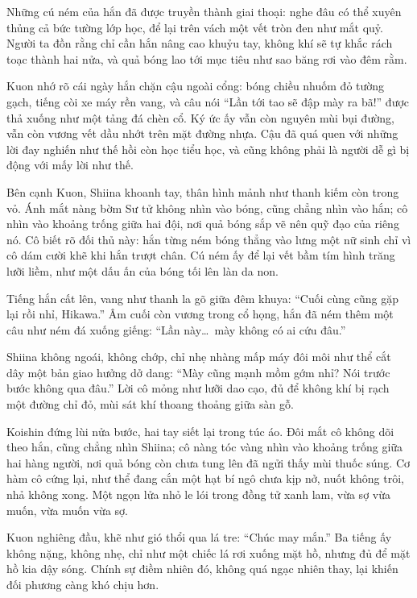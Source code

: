 \documentclass[../main.tex]{subfiles}
\begin{document}
Những cú ném của hắn đã được truyền thành giai thoại: nghe đâu có thể xuyên thủng cả bức tường lớp học, để lại trên vách một vết tròn đen như mắt quỷ. Người ta đồn rằng chỉ cần hắn nâng cao khuỷu tay, không khí sẽ tự khắc rách toạc thành hai nửa, và quả bóng lao tới mục tiêu như sao băng rơi vào đêm rằm.

Kuon nhớ rõ cái ngày hắn chặn cậu ngoài cổng: bóng chiều nhuốm đỏ tường gạch, tiếng còi xe máy rền vang, và câu nói ``Lần tới tao sẽ đập mày ra bã!'' được thả xuống như một tảng đá chèn cổ. Ký ức ấy vẫn còn nguyên mùi bụi đường, vẫn còn vương vết dầu nhớt trên mặt đường nhựa. Cậu đã quá quen với những lời đay nghiến như thế hồi còn học tiểu học, và cũng không phải là người dễ gì bị động với mấy lời như thế.

Bên cạnh Kuon, Shiina khoanh tay, thân hình mảnh như thanh kiếm còn trong vỏ. Ánh mắt nàng bờm Sư tử không nhìn vào bóng, cũng chẳng nhìn vào hắn; cô nhìn vào khoảng trống giữa hai đội, nơi quả bóng sắp vẽ nên quỹ đạo của riêng nó. Cô biết rõ đối thủ này: hắn từng ném bóng thẳng vào lưng một nữ sinh chỉ vì cô dám cười khẽ khi hắn trượt chân. Cú ném ấy để lại vết bầm tím hình trăng lưỡi liềm, như một dấu ấn của bóng tối lên làn da non.

Tiếng hắn cất lên, vang như thanh la gõ giữa đêm khuya: ``Cuối cùng cũng gặp lại rồi nhỉ, Hikawa.'' Âm cuối còn vương trong cổ họng, hắn đã ném thêm một câu như ném đá xuống giếng: ``Lần này\dots\ mày không có ai cứu đâu.''

Shiina không ngoái, không chớp, chỉ nhẹ nhàng mấp máy đôi môi như thể cắt dây một bản giao hưởng dở dang: ``Mày cũng mạnh mồm gớm nhỉ? Nói trước bước không qua đâu.'' Lời cô mỏng như lưỡi dao cạo, đủ để không khí bị rạch một đường chỉ đỏ, mùi sát khí thoang thoảng giữa sàn gỗ.

Koishin đứng lùi nửa bước, hai tay siết lại trong túc áo. Đôi mắt cô không dõi theo hắn, cũng chẳng nhìn Shiina; cô nàng tóc vàng nhìn vào khoảng trống giữa hai hàng người, nơi quả bóng còn chưa tung lên đã ngửi thấy mùi thuốc súng. Cơ hàm cô cứng lại, như thể đang cắn một hạt bí ngô chưa kịp nở, nuốt không trôi, nhả không xong. Một ngọn lửa nhỏ le lói trong đồng tử xanh lam, vừa sợ vừa muốn, vừa muốn vừa sợ.

Kuon nghiêng đầu, khẽ như gió thổi qua lá tre: ``Chúc may mắn.'' Ba tiếng ấy không nặng, không nhẹ, chỉ như một chiếc lá rơi xuống mặt hồ, nhưng đủ để mặt hồ kia dậy sóng. Chính sự điềm nhiên đó, không quá ngạc nhiên thay, lại khiến đối phương càng khó chịu hơn.
\end{document}
